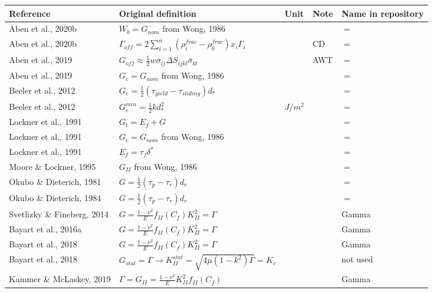 \documentclass{article}
\begin{document}
\begin{longtable}{|p{4 cm}|p{8 cm}|p{1.25 cm}|p{1.25 cm}|p{1.5 cm}|}
\hline
\textbf{Reference} & \textbf{Original definition} & \textbf{Unit} & \textbf{Note} & \textbf{Name in repository} \\ \hline
Aben et al., 2020b & \(\displaystyle W_b = G_{nom} \) from Wong, 1986 & & & $=$ \\
Aben et al., 2020b & \(\displaystyle \Gamma_{off} = 2 \sum_{i=1}^{n} (\rho_{i}^{frac}-\rho_{0}^{frac}) x_i \Gamma_i \) & & CD & $=$ \\
Aben et al., 2019 & \( \displaystyle G_{off} \approx \frac{1}{2} w \overline{\sigma}_{ij} \Delta S_{ijkl} \overline{\sigma}_{kl} \) & & AWT & $=$ \\
Aben et al., 2019 & \( \displaystyle G_c=G_{nom} \) from Wong, 1986 & & & $=$ \\
Beeler et al., 2012 & \( \displaystyle G_e = \frac{1}{2} (\tau_{yield}-\tau_{sliding}) d_* \) & & & $=$ \\
Beeler et al., 2012 & \( \displaystyle G_e^{min} = \frac{1}{2} k d_*^2 \) & $J/m^2$ & & $=$ \\
Lockner et al., 1991 & \( \displaystyle G_t = E_f + G \) & & & $=$ \\
Lockner et al., 1991 & \( \displaystyle G_c = G_{nom} \) from Wong, 1986 & & & $=$ \\
Lockner et al., 1991 & \( \displaystyle E_f = \tau_f \delta^* \)& & & $=$ \\
Moore \& Lockner, 1995 & \( \displaystyle G_{II} \) from Wong, 1986 & & & $=$ \\
Okubo \& Dieterich, 1981 & \( \displaystyle G = \frac{1}{2} (\tau_p - \tau_r) d_r \) & & & $=$ \\
Okubo \& Dieterich, 1984 & \( \displaystyle G = \frac{1}{2} (\tau_p - \tau_r) d_r \) & & & $=$ \\
Svetlizky \& Fineberg, 2014 & \( \displaystyle G = \frac{1-\nu^2}{E} f_{II}(C_f) K_{II}^2 = \Gamma \) & & & Gamma \\
Bayart et al., 2016a & \( \displaystyle G = \frac{1-\nu^2}{E} f_{II}(C_f) K_{II}^2 = \Gamma \) & & & Gamma \\
Bayart et al., 2018 & \( \displaystyle G = \frac{1-\nu^2}{E} f_{II}(C_f) K_{II}^2 = \Gamma \) & & & Gamma \\
Bayart et al., 2018 & \( \displaystyle G_{stat} = \Gamma \rightarrow K_{II}^{stat} = \sqrt{4 \mu (1-k^2) \Gamma} = K_c \) & & & not used \\
Kammer \& McLaskey, 2019 & \( \displaystyle \Gamma = G_{II} = \frac{1-\nu^2}{E} K_{II}^2 f_{II}(C_f)\) & & & Gamma \\

\end{longtable}
\end{document}
